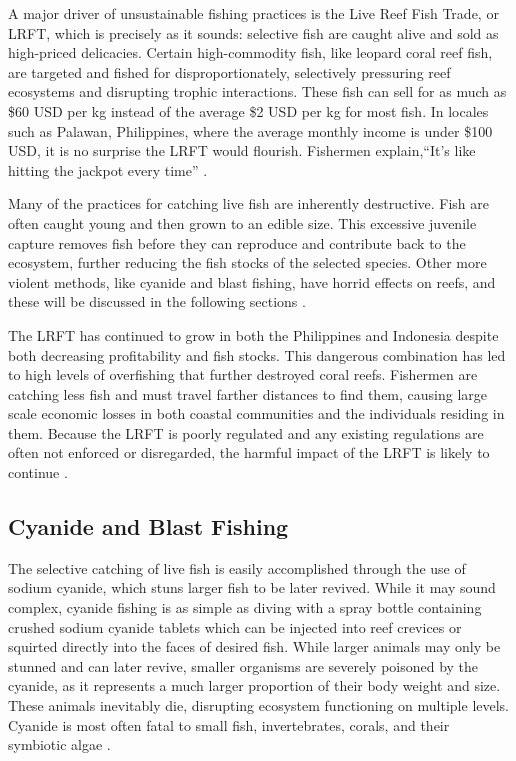 \documentclass{book}\usepackage{knitr}
\begin{document}
A major driver of unsustainable fishing practices is the Live Reef Fish Trade, or LRFT, which is precisely as it sounds: selective fish are caught alive and sold as high-priced delicacies. Certain high-commodity fish, like leopard coral reef fish, are targeted and fished for disproportionately, selectively pressuring reef ecosystems and disrupting trophic interactions. These fish can sell for as much as \$60 USD per kg instead of the average \$2 USD per kg for most fish. In locales such as Palawan, Philippines, where the average monthly income is under \$100 USD, it is no surprise the LRFT would flourish. Fishermen explain,``It's like hitting the jackpot every time'' \citep{10.2307/40603032}. 

Many of the practices for catching live fish are inherently destructive. Fish are often caught young and then grown to an edible size. This excessive juvenile capture removes fish before they can reproduce and contribute back to the ecosystem, further reducing the fish stocks of the selected species. Other more violent methods, like cyanide and blast fishing, have horrid effects on reefs, and these will be discussed in the following sections \citep{10.2307/40603032}.  

The LRFT has continued to grow in both the Philippines and Indonesia despite both decreasing profitability and fish stocks. This dangerous combination has led to high levels of overfishing that further destroyed coral reefs. Fishermen are catching less fish and must travel farther distances to find them, causing large scale economic losses in both coastal communities and the individuals residing in them. Because the LRFT is poorly regulated and any existing regulations are often not enforced or disregarded, the harmful impact of the LRFT is likely to continue \citep{10.2307/40603032}.

\subsection{Cyanide and Blast Fishing}

The selective catching of live fish is easily accomplished through the use of sodium cyanide, which stuns larger fish to be later revived. While it may sound complex, cyanide fishing is as simple as diving with a spray bottle containing crushed sodium cyanide tablets which can be injected into reef crevices or squirted directly into the faces of desired fish. While larger animals may only be stunned and can later revive, smaller organisms are severely poisoned by the cyanide, as it represents a much larger proportion of their body weight and size. These animals inevitably die, disrupting ecosystem functioning on multiple levels. Cyanide is most often fatal to small fish, invertebrates, corals, and their symbiotic algae \citep{wwfcyanide}.
\end{document}
